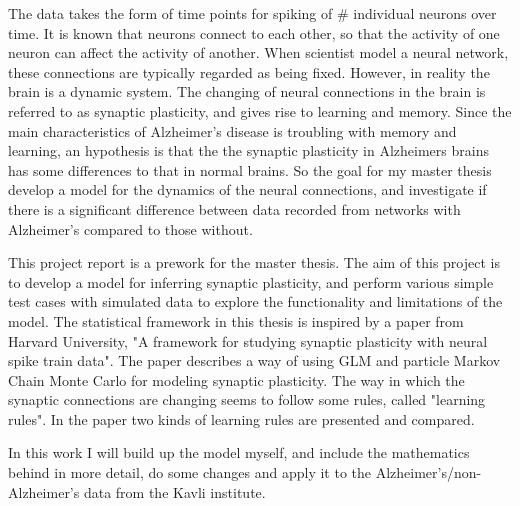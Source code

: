The data takes the form of time points for spiking of # individual neurons over time. It is known that neurons connect to each other, so that the activity of one neuron can affect the activity of another. When scientist model a neural network, these connections are typically regarded as being fixed. However, in reality the brain is a dynamic system. The changing of neural connections in the brain is referred to as synaptic plasticity, and gives rise to learning and memory. Since the main  characteristics of Alzheimer's disease is troubling with memory and learning, an hypothesis is that the the synaptic plasticity in Alzheimers brains has some differences to that in normal brains. So the goal for my master thesis develop a model for the dynamics of the neural connections, and investigate if there is a significant difference between data recorded from networks with Alzheimer's compared to those without. 

This project report is a prework for the master thesis. The aim of this project is to develop a model for inferring synaptic plasticity, and perform various simple test cases with simulated data to explore the functionality and limitations of the model. The statistical framework in this thesis is inspired by a paper from Harvard University, "A framework for studying synaptic plasticity with neural spike train data". The paper describes a way of using GLM and particle Markov Chain Monte Carlo for modeling synaptic plasticity. The way in which the synaptic connections are changing seems to follow some rules, called "learning rules". In the paper two kinds of learning rules are presented and compared.

In this work I will build up the model myself, and include the mathematics behind in more detail, do some changes and apply it to the Alzheimer's/non-Alzheimer's data from the Kavli institute.